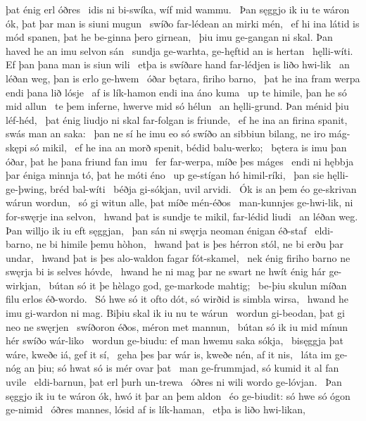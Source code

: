 þat énig erl óðres \hld\ idis ni bi-swíka,
wíf mid wammu. \hld\ Þan sęggjo ik iu te wáron ók,
þat þar man is siuni mugun \hld\ swíðo far-lédean
an mirki mén, \hld\ ef hi ina látid is mód spanen,
þat he be-ginna þero girnean, \hld\ þiu imu ge-gangan ni skal.
Þan haved he an imu selvon sán \hld\ sundja ge-warhta,
ge-hęftid an is hertan \hld\ hęlli-wíti.
Ef þan þana man is siun wili \hld\ etþa is swíðare hand
far-lédjen is liðo hwi-lik \hld\ an léðan weg,
þan is erlo ge-hwem \hld\ óðar bętara,
firiho barno, \hld\ þat he ina fram werpa
endi þana lið lósje \hld\ af is lík-hamon
endi ina áno kuma \hld\ up te himile,
þan he só mid allun \hld\ te þem inferne,
hwerve mid só hélun \hld\ an hęlli-grund.
Þan ménid þiu léf-héd, \hld\ þat énig liudjo ni skal
far-folgan is friunde, \hld\ ef he ina an firina spanit,
swás man an saka: \hld\ þan ne sí he imu eo só swíðo an sibbiun bilang,
ne iro mág-skępi só mikil, \hld\ ef he ina an morð spenit,
bédid balu-werko; \hld\ bętera is imu þan óðar,
þat he þana friund fan imu \hld\ fer far-werpa,
míðe þes máges \hld\ endi ni hębbja þar éniga minnja tó,
þat he móti éno \hld\ up ge-stígan
hó himil-ríki, \hld\ þan sie hęlli-ge-þwing,
bréd bal-wíti \hld\ béðja gi-sókjan,
uvil arvidi. \hld\ Ók is an þem éo ge-skrivan
wárun wordun, \hld\ só gi witun alle,
þat míðe mén-éðos \hld\ man-kunnjes ge-hwi-lik,
ni for-swęrje ina selvon, \hld\ hwand þat is sundje te mikil,
far-lédid liudi \hld\ an léðan weg.
Þan willjo ik iu eft sęggjan, \hld\ þan sán ni swęrja neoman
énigan éð-staf \hld\ eldi-barno,
ne bi himile þemu hòhon, \hld\ hwand þat is þes hérron stól,
ne bi erðu þar undar, \hld\ hwand þat is þes alo-waldon
fagar fót-skamel, \hld\ nek énig firiho barno
ne swęrja bi is selves hóvde, \hld\ hwand he ni mag þar ne swart ne hwít
énig hár ge-wirkjan, \hld\ bútan só it þe hèlago god,
ge-markode mahtig; \hld\ be-þiu skulun míðan filu
erlos éð-wordo. \hld\ Só hwe só it ofto dót,
só wirðid is simbla wirsa, \hld\ hwand he imu gi-wardon ni mag.
Biþiu skal ik iu nu te wárun \hld\ wordun gi-beodan,
þat gi neo ne swęrjen \hld\ swíðoron éðos,
méron met mannun, \hld\ bútan só ik iu mid mínun hér
swíðo wár-liko \hld\ wordun ge-biudu:
ef man hwemu saka sókja, \hld\ bisęggja þat wáre,
kweðe iá, gef it sí, \hld\ geha þes þar wár is,
kweðe nén, af it nis, \hld\ láta im ge-nóg an þiu;
só hwat só is mér ovar þat \hld\ man ge-frummjad,
só kumid it al fan uvile \hld\ eldi-barnun,
þat erl þurh un-trewa \hld\ óðres ni wili
wordo ge-lóvjan. \hld\ Þan sęggjo ik iu te wáron ók,
hwó it þar an þem aldon \hld\ éo ge-biudit:
só hwe só ógon ge-nimid \hld\ óðres mannes,
lósid af is lík-haman, \hld\ etþa is liðo hwi-likan,
